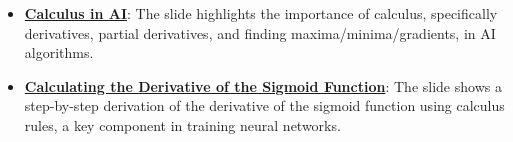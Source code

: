 \documentclass{article}%
\begin{document}
\begin{itemize}[leftmargin=*]
\item \href{https://purdue.brightspace.com/d2l/common/assets/pdfjs-d2l-dist/1.0.14-legacy/web/viewer.html?file=\%2Fcontent\%2Fenforced\%2F1095467-wl.202510.CS.24300.001\%2F04L1-Linear Algebra Primer.pdf\%3Fou\%3D1095467\&lang=en-us\&container=d2l-fileviewer-rendered-pdf\&fullscreen=d2l-fileviewer-rendered-pdf-dialog\&height=667#page=19}{\textbf{Calculus in AI}}: The slide highlights the importance of calculus, specifically derivatives, partial derivatives, and finding maxima/minima/gradients, in AI algorithms.%
\item \href{https://purdue.brightspace.com/d2l/common/assets/pdfjs-d2l-dist/1.0.14-legacy/web/viewer.html?file=\%2Fcontent\%2Fenforced\%2F1095467-wl.202510.CS.24300.001\%2F04L1-Linear Algebra Primer.pdf\%3Fou\%3D1095467\&lang=en-us\&container=d2l-fileviewer-rendered-pdf\&fullscreen=d2l-fileviewer-rendered-pdf-dialog\&height=667#page=21}{\textbf{Calculating the Derivative of the Sigmoid Function}}: The slide shows a step-by-step derivation of the derivative of the sigmoid function using calculus rules, a key component in training neural networks.%
\end{itemize}%
\end{document}
